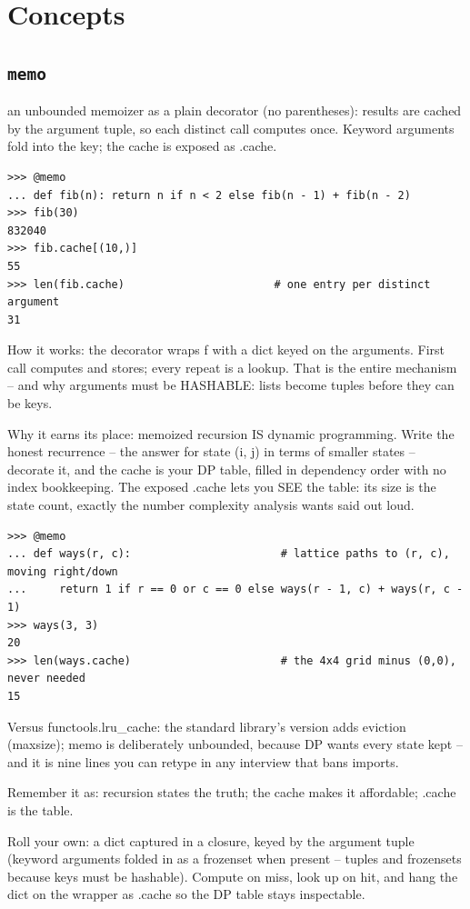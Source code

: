 \documentclass[10pt,letterpaper]{book}
\begin{document}
\section{Concepts}
\subsection{\texttt{memo}}\label{def:memo}
an unbounded memoizer as a plain decorator (no parentheses): results are cached by the argument tuple, so each distinct call computes once. Keyword arguments fold into the key; the cache is exposed as .cache.
\begin{lstlisting}[style=ex]
>>> @memo
... def fib(n): return n if n < 2 else fib(n - 1) + fib(n - 2)
>>> fib(30)
832040
>>> fib.cache[(10,)]
55
>>> len(fib.cache)                       # one entry per distinct argument
31
\end{lstlisting}

How it works: the decorator wraps f with a dict keyed on the arguments. First call computes and stores; every repeat is a lookup. That is the entire mechanism -- and why arguments must be HASHABLE: lists become tuples before they can be keys.


Why it earns its place: memoized recursion IS dynamic programming. Write the honest recurrence -- the answer for state (i, j) in terms of smaller states -- decorate it, and the cache is your DP table, filled in dependency order with no index bookkeeping. The exposed .cache lets you SEE the table: its size is the state count, exactly the number complexity analysis wants said out loud.

\begin{lstlisting}[style=ex]
>>> @memo
... def ways(r, c):                       # lattice paths to (r, c), moving right/down
...     return 1 if r == 0 or c == 0 else ways(r - 1, c) + ways(r, c - 1)
>>> ways(3, 3)
20
>>> len(ways.cache)                       # the 4x4 grid minus (0,0), never needed
15
\end{lstlisting}

Versus functools.lru\_cache: the standard library's version adds eviction (maxsize); memo is deliberately unbounded, because DP wants every state kept -- and it is nine lines you can retype in any interview that bans imports.


Remember it as: recursion states the truth; the cache makes it affordable; .cache is the table.


Roll your own: a dict captured in a closure, keyed by the argument tuple (keyword arguments folded in as a frozenset when present -- tuples and frozensets because keys must be hashable). Compute on miss, look up on hit, and hang the dict on the wrapper as .cache so the DP table stays inspectable.
\end{document}
